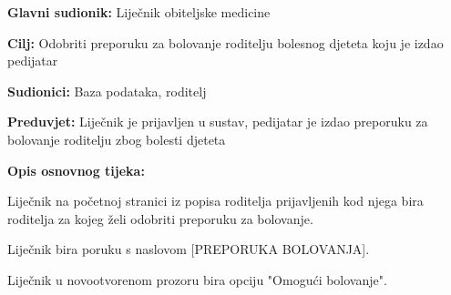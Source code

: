 					\noindent {}
					\begin{packed_item}
						
						\item \textbf{Glavni sudionik: }Liječnik obiteljske medicine
						\item  \textbf{Cilj:} Odobriti preporuku za bolovanje roditelju bolesnog djeteta koju je izdao pedijatar
						\item  \textbf{Sudionici:} Baza podataka, roditelj
						\item  \textbf{Preduvjet:} Liječnik je prijavljen u sustav, pedijatar je izdao preporuku za bolovanje roditelju zbog bolesti djeteta
						\item  \textbf{Opis osnovnog tijeka:}
						
						\item[] \begin{packed_enum}
							
							\item Liječnik na početnoj stranici iz popisa roditelja prijavljenih kod njega bira roditelja za kojeg želi odobriti preporuku za bolovanje.
							\item Liječnik bira poruku s naslovom [PREPORUKA BOLOVANJA].
							\item Liječnik u novootvorenom prozoru bira opciju "Omogući bolovanje".
						\end{packed_enum}
						
						
						
					\end{packed_item}
					
